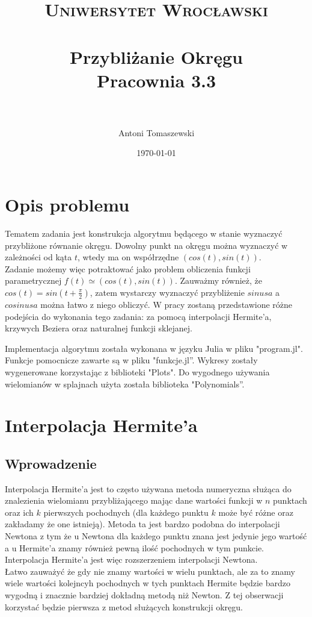 \documentclass[paper=a4, fontsize=11pt]{scrartcl} %
\title{	
\normalfont \normalsize 
\textsc{Uniwersytet Wrocławski} \\ [25pt] %
\horrule{0.5pt} \\[0.4cm] %
\huge Przybliżanie Okręgu \\
\large Pracownia 3.3 \\ %
\horrule{2pt} \\[0.5cm] %
}
\author{Antoni Tomaszewski} %
\date{\normalsize\today} %
\numberwithin{equation}{section} %
\numberwithin{figure}{section} %
\numberwithin{table}{section} %
\begin{document}
\maketitle %


\section{Opis problemu}
Tematem zadania jest konstrukcja algorytmu będącego w stanie wyznaczyć przybliżone równanie okręgu. Dowolny punkt na okręgu można wyznaczyć w zależności od kąta $t$, wtedy ma on współrzędne $(cos(t), sin(t))$.  \\
Zadanie możemy więc potraktować jako problem obliczenia funkcji parametrycznej $f(t) \simeq (cos(t), sin(t))$. Zauważmy również, że $cos(t) = sin(t+\frac{\pi}{2})$, zatem wystarczy wyznaczyć przybliżenie $sinusa$ a $cosinusa$ można łatwo z niego obliczyć. W pracy zostaną przedstawione różne podejścia do wykonania tego zadania: za pomocą interpolacji Hermite'a, krzywych Beziera oraz naturalnej funkcji sklejanej.

\medbreak
Implementacja algorytmu została wykonana w języku Julia w pliku "program.jl".
Funkcje pomocnicze zawarte są w pliku "funkcje.jl''.
Wykresy zostały wygenerowane korzystając z biblioteki "Plots".
Do wygodnego używania wielomianów w splajnach użyta została biblioteka "Polynomials''.

\section{Interpolacja Hermite'a}

\subsection{Wprowadzenie}
Interpolacja Hermite'a jest to często używana metoda numeryczna służąca do znalezienia wielomianu przybliżającego mając dane wartości funkcji w $n$ punktach oraz ich $k$ pierwszych pochodnych (dla każdego punktu $k$ może być różne oraz zakładamy że one istnieją). Metoda ta jest bardzo podobna do interpolacji Newtona z tym że u Newtona dla każdego punktu znana jest jedynie jego wartość a u Hermite'a znamy również pewną ilość pochodnych w tym punkcie. Interpolacja Hermite'a jest więc rozszerzeniem interpolacji Newtona.\\ 
Łatwo zauważyć że gdy nie znamy wartości w wielu punktach, ale za to znamy wiele wartości kolejncyh pochodnych w tych punktach Hermite będzie bardzo wygodną i znacznie bardziej dokładną metodą niż Newton. Z tej obserwacji korzystać będzie pierwsza z metod służących konstrukcji okręgu.
\end{document}
